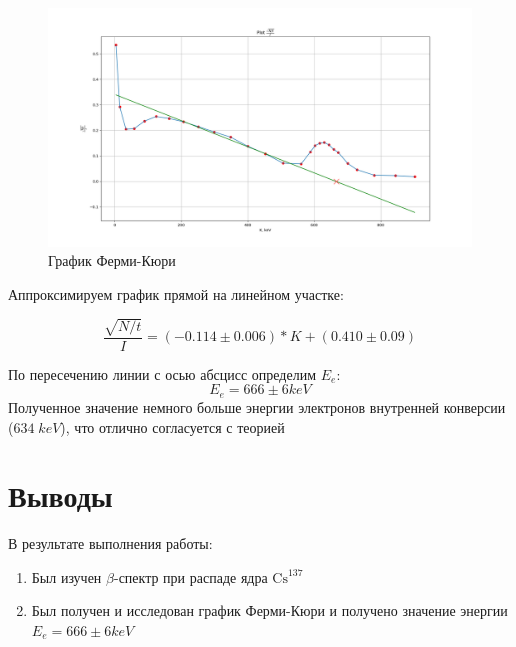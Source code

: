 \documentclass{article}
\begin{document}
\begin{figure}[H]
	\includegraphics[width=\textwidth]{K-Nr.png}
	\caption{График Ферми-Кюри}
\end{figure}

Аппроксимируем график прямой на линейном участке:

\[ \frac{\sqrt{N/t}}{I} = (-0.114 \pm 0.006) * K + (0.410 \pm 0.09)\]

По пересечению линии с осью абсцисс определим \(E_e\):
\[ E_e = 666 \pm 6 keV\]
Полученное значение	немного больше энергии электронов внутренней конверсии (\(634\; keV\)),
что отлично согласуется с теорией

\section{Выводы}
В результате выполнения работы:
\begin{enumerate}
	\item Был изучен \(\beta\)-спектр при распаде ядра \(\text{Cs}^{137}\)
	\item Был получен и исследован график Ферми-Кюри и получено значение энергии \(E_e = 666 \pm 6 keV\)
\end{enumerate}
\end{document}
